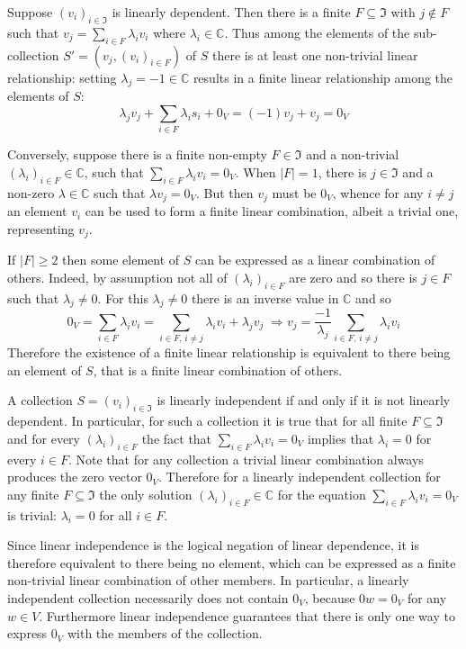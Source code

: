 \documentclass[a4paper]{article}
\newcommand{\abs}[1]{\ensuremath{\left| #1 \right|}}
\newcommand{\brac}[1]{\ensuremath{\left( #1 \right)}}
\begin{document}
Suppose $\brac{v_i}_{i\in \mathfrak{I}}$ is linearly dependent. Then there is a finite $F\subseteq \mathfrak{I}$ with $j\notin F$ such that $v_j = \sum_{i\in F} \lambda_i v_i$ where $\lambda_i\in \mathbb{C}$. Thus among the elements of the sub-collection $S'=\brac{v_j, \brac{v_i}_{i\in F}}$ of $S$ there is at least one non-trivial linear relationship: setting $\lambda_j=-1\in\mathbb{C}$ results in a finite linear relationship among the elements of $S$: \[\lambda_j v_j + \sum_{i\in F} \lambda_i s_i + 0_V= (-1) v_j + v_j = 0_V\]

Conversely, suppose there is a finite non-empty $F\in \mathfrak{I}$ and a non-trivial $\brac{\lambda_i}_{i\in F}\in \mathbb{C}$, such that $\sum_{i\in F} \lambda_i v_i = 0_V$. When $\abs{F}=1$, there is $j\in \mathfrak{I}$ and a non-zero $\lambda\in\mathbb{C}$ such that $\lambda v_j = 0_V$. But then $v_j$ must be $0_V$, whence for any $i\neq j$ an element $v_i$ can be used to form a finite linear combination, albeit a trivial one, representing $v_j$.

If $\abs{F}\geq 2$ then some element of $S$ can be expressed as a linear combination of others. Indeed, by assumption not all of $\brac{\lambda_i}_{i\in F}$ are zero and so there is $j\in F$ such that $\lambda_j\neq 0$. For this $\lambda_j\neq 0$ there is an inverse value in $\mathbb{C}$ and so \[0_V = \sum_{i\in F} \lambda_i v_i = \sum_{i\in F,\,i\neq j} \lambda_i v_i + \lambda_j v_j\;\Rightarrow v_j = \frac{-1}{\lambda_j}\sum_{i\in F,\,i\neq j} \lambda_i v_i\] Therefore the existence of a finite linear relationship is equivalent to there being an element of $S$, that is a finite linear combination of others.

A collection $S=\brac{v_i}_{i\in\mathfrak{I}}$ is linearly independent if and only if it is not linearly dependent. In particular, for such a collection it is true that for all finite $F\subseteq\mathfrak{I}$ and for every $\brac{\lambda_i}_{i\in F}$ the fact that $\sum_{i\in F}\lambda_i v_i = 0_V$ implies that $\lambda_i = 0$ for every $i\in F$. Note that for any collection a trivial linear combination always produces the zero vector $0_V$. Therefore for a linearly independent collection for any finite $F\subseteq\mathfrak{I}$ the only solution $\brac{\lambda_i}_{i\in F}\in \mathbb{C}$ for the equation $\sum_{i\in F}\lambda_i v_i = 0_V$ is trivial: $\lambda_i=0$ for all $i\in F$.

Since linear independence is the logical negation of linear dependence, it is therefore equivalent to there being no element, which can be expressed as a finite non-trivial linear combination of other members. In particular, a linearly independent collection necessarily does not contain $0_V$, because $0 w=0_V$ for any $w\in V$. Furthermore linear independence guarantees that there is only one way to express $0_V$ with the members of the collection.
\end{document}
